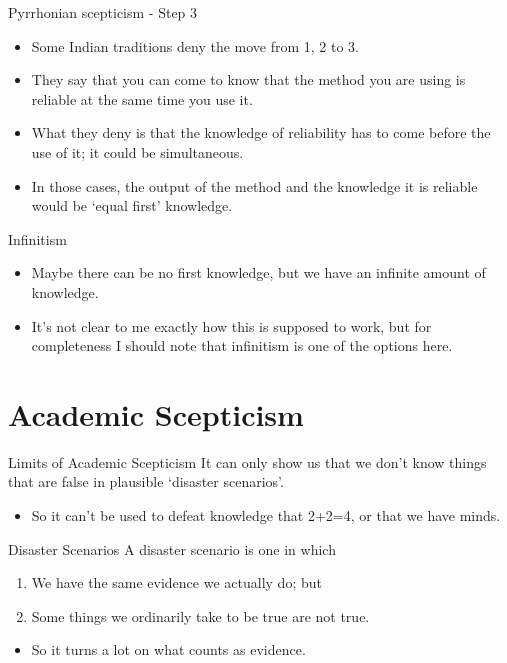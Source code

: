 \documentclass[
  17pt,
  letterpaper,
  ignorenonframetext,
  aspectratio=169,
]{beamer}
\providecommand{\tightlist}{%
  \setlength{\itemsep}{0pt}\setlength{\parskip}{0pt}}\usepackage{longtable,booktabs,array}
\begin{document}
\begin{frame}{Pyrrhonian scepticism - Step 3}
\protect\hypertarget{pyrrhonian-scepticism---step-3}{}
\begin{itemize}[<+->]
\tightlist
\item
  Some Indian traditions deny the move from 1, 2 to 3.
\item
  They say that you can come to know that the method you are using is
  reliable at the same time you use it.
\item
  What they deny is that the knowledge of reliability has to come before
  the use of it; it could be simultaneous.
\item
  In those cases, the output of the method and the knowledge it is
  reliable would be `equal first' knowledge.
\end{itemize}
\end{frame}

\begin{frame}{Infinitism}
\protect\hypertarget{infinitism}{}
\begin{itemize}[<+->]
\tightlist
\item
  Maybe there can be no first knowledge, but we have an infinite amount
  of knowledge.
\item
  It's not clear to me exactly how this is supposed to work, but for
  completeness I should note that infinitism is one of the options here.
\end{itemize}
\end{frame}

\hypertarget{academic-scepticism-1}{%
\section{Academic Scepticism}\label{academic-scepticism-1}}

\begin{frame}{Limits of Academic Scepticism}
\protect\hypertarget{limits-of-academic-scepticism}{}
It can only show us that we don't know things that are false in
plausible `disaster scenarios'.

\begin{itemize}[<+->]
\tightlist
\item
  So it can't be used to defeat knowledge that 2+2=4, or that we have
  minds.
\end{itemize}
\end{frame}

\begin{frame}{Disaster Scenarios}
\protect\hypertarget{disaster-scenarios}{}
A disaster scenario is one in which

\begin{enumerate}[<+->]
\tightlist
\item
  We have the same evidence we actually do; but
\item
  Some things we ordinarily take to be true are not true.
\end{enumerate}

\begin{itemize}[<+->]
\tightlist
\item
  So it turns a lot on what counts as evidence.
\end{itemize}
\end{frame}
\end{document}
